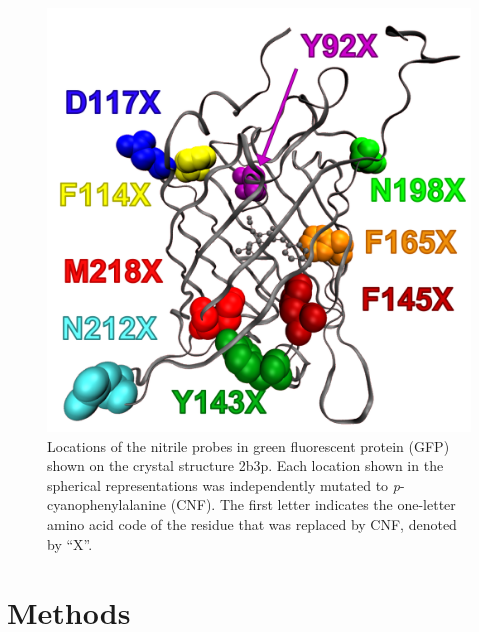 \begin{figure}
    \center
    \includegraphics[width=\single]{figures-gfp-hbond/system.png}
    \caption[Locations of the nitrile probes in GFP]{
        Locations of the nitrile probes in green fluorescent protein (GFP) shown on the crystal structure 2b3p. 
        Each location shown in the spherical representations was independently mutated to \emph{p}-cyanophenylalanine (CNF). 
        The first letter indicates the one-letter amino acid code of the residue that was replaced by CNF, denoted by ``X''.
    }
    \label{fig:hbond-system}
\end{figure}

\section{Methods}

